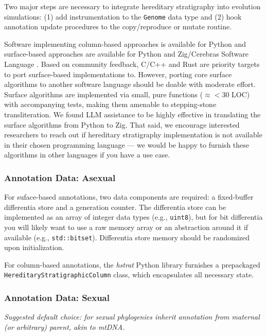 Two major steps are necessary to integrate hereditary stratigraphy into evolution simulations: (1) add instrumentation to the \texttt{Genome} data type and (2) hook annotation update procedures to the copy/reproduce or mutate routine.

Software implementing column-based approaches is available for Python \citep{moreno2022hstrat} and surface-based approaches are available for Python \citep{moreno2024hsurf} and Zig/Cerebras Software Language \citep{moreno2024wse}.
Based on community feedback, C/C++ and Rust are priority targets to port surface-based implementations to.
However, porting core surface algorithms to another software language should be doable with moderate effort.
Surface algorithms are implemented via small, pure functions ($\approx<30$ LOC) with accompanying tests, making them amenable to stepping-stone transliteration.
We found LLM assistance to be highly effective in translating the surface algorithms from Python to Zig.
That said, we encourage interested researchers to reach out if hereditary stratigraphy implementation is not available in their chosen programming language --- we would be happy to furnish these algorithms in other languages if you have a use case.

\subsubsection{Annotation Data: Asexual}

For suface-based annotations, two data components are required: a fixed-buffer differentia store and a generation counter.
The differentia store can be implemented as an array of integer data types (e.g., \texttt{uint8}), but for bit differentia you will likely want to use a raw memory array or an abstraction around it if available (e.g., \texttt{std::bitset}).
Differentia store memory should be randomized upon initialization.

For column-based annotations, the \textit{hstrat} Python library furnishes a prepackaged \texttt{HereditaryStratigraphicColumn} class, which encapsulates all necessary state.

\subsubsection{Annotation Data: Sexual}
\textit{Suggested default choice: for sexual phylogenies inherit annotation from maternal (or arbitrary) parent, akin to mtDNA.}

